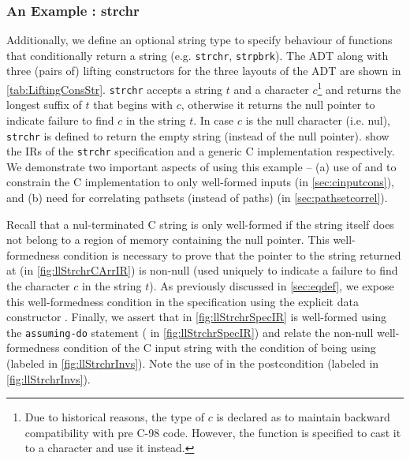 \subsubsection{An Example : strchr}
\label{sec:strchrexample}
Additionally, we define an optional string type  to specify
behaviour of functions that conditionally return a string (e.g. {\tt strchr}, {\tt strpbrk}).
The  ADT along with three (pairs of) lifting constructors for the three layouts of the  ADT
are shown in \cref{tab:LiftingConsStr}.
{\tt strchr} accepts a string $t$ and a character $c$\footnote{Due to historical reasons,
the type of $c$ is declared as 
to maintain backward compatibility with pre C-98 code.
However, the function is specified to cast it to a character and use it instead.} and returns
the longest suffix of $t$ that begins with $c$, otherwise it returns the null pointer to indicate
failure to find $c$ in the string $t$.
In case $c$ is the null character (i.e. nul), {\tt strchr} is defined to return the empty string (instead of the null pointer).
 show the IRs of the {\tt strchr} specification and
a generic C implementation respectively.
We demonstrate two important aspects of \toolName{} using this example -- (a) use of \sdef{} and \pre{} to constrain the C implementation
to only well-formed inputs (in \cref{sec:cinputcons}),
and (b) need for correlating pathsets (instead of paths) (in \cref{sec:pathsetcorrel}).

Recall that a nul-terminated C string is only well-formed if the string itself does not belong to a region of memory containing the null pointer.
This well-formedness condition is necessary to prove that the pointer to the string returned at  (in \cref{fig:llStrchrCArrIR})
is non-null (used uniquely to indicate a failure to find the character $c$ in the string $t$).
As previously discussed in \cref{sec:eqdef}, we expose this well-formedness condition in the specification using
the explicit  data constructor .
Finally, we assert that  in \cref{fig:llStrchrSpecIR} is well-formed using the {\tt assuming-do} statement
( in \cref{fig:llStrchrSpecIR}) and relate the non-null well-formedness condition of the C input string 
with the condition of  being  using \pre{} (labeled  in \cref{fig:llStrchrInvs}).
Note the use of  in the postcondition (labeled  in \cref{fig:llStrchrInvs}).

